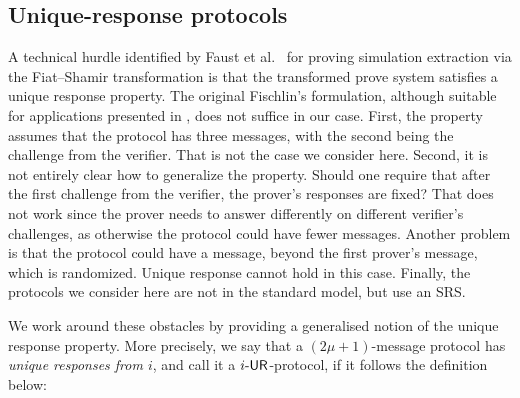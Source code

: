 
\subsection{Unique-response protocols}
A technical hurdle identified by Faust et al.~\cite{INDOCRYPT:FKMV12} for proving
simulation extraction via the Fiat--Shamir transformation is that the transformed
prove system satisfies a unique response property. The original Fischlin's
formulation, although suitable for applications presented in
\cite{C:Fischlin05,INDOCRYPT:FKMV12}, does not suffice in our case. First, the
property assumes that the protocol has three messages, with the second being the
challenge from the verifier. That is not the case we consider here. Second, it is not
entirely clear how to generalize the property. Should one require that after the
first challenge from the verifier, the prover's responses are fixed?  That does not
work since the prover needs to answer differently on different verifier's challenges,
as otherwise the protocol could have fewer messages.  Another problem is that the
protocol could have a message, beyond the first prover's message, which is
randomized. Unique response cannot hold in this case. Finally, the protocols we
consider here are not in the standard model, but use an SRS.

We work around these obstacles by providing a generalised notion of the unique
response property. More precisely, we say that a $(2\mu + 1)$-message protocol
has \emph{unique responses from $i$}, and call it a ${i\text{-}\mathsf{UR}}$-protocol, if it
follows the definition below:


